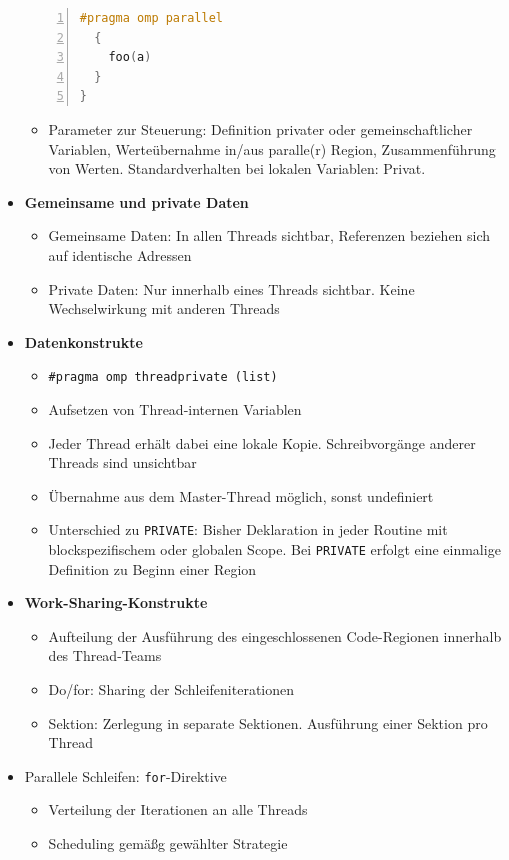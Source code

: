 \begin{itemize}
\begin{lstlisting}[frame=single,numbers=left,mathescape,language=C]
  #pragma omp parallel
  {
    foo(a)
  }
}
	\end{lstlisting}
	\begin{itemize}
		\item Parameter zur Steuerung: Definition privater oder gemeinschaftlicher Variablen, Werteübernahme in/aus paralle(r) Region, Zusammenführung von Werten. Standardverhalten bei lokalen Variablen: Privat.
	\end{itemize}
	\item \textbf{Gemeinsame und private Daten}
	\begin{itemize}
		\item Gemeinsame Daten: In allen Threads sichtbar, Referenzen beziehen sich auf identische Adressen
		\item Private Daten: Nur innerhalb eines Threads sichtbar. Keine Wechselwirkung mit anderen Threads
	\end{itemize}
	\item \textbf{Datenkonstrukte}
	\begin{itemize}
		\item \texttt{\#pragma omp threadprivate (list)}
		\item Aufsetzen von Thread-internen Variablen
		\item Jeder Thread erhält dabei eine lokale Kopie. Schreibvorgänge anderer Threads sind unsichtbar
		\item Übernahme aus dem Master-Thread möglich, sonst undefiniert
		\item Unterschied zu \texttt{PRIVATE}: Bisher Deklaration in jeder Routine mit blockspezifischem oder globalen Scope. Bei \texttt{PRIVATE} erfolgt eine einmalige Definition zu Beginn einer Region
	\end{itemize}
	\item \textbf{Work-Sharing-Konstrukte}
	\begin{itemize}
		\item Aufteilung der Ausführung des eingeschlossenen Code-Regionen innerhalb des Thread-Teams
		\item Do/for: Sharing der Schleifeniterationen
		\item Sektion: Zerlegung in separate Sektionen. Ausführung einer Sektion pro Thread
	\end{itemize}
	\item Parallele Schleifen: \texttt{for}-Direktive
	\begin{itemize}
		\item Verteilung der Iterationen an alle Threads
		\item Scheduling gemäßg gewählter Strategie

\end{itemize}
\end{itemize}
